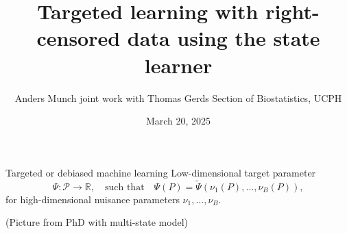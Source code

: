 \documentclass[smaller]{beamer}\usepackage{listings}
\author{Anders Munch \newline \small joint work with Thomas Gerds \newline \newline Section of Biostatistics, UCPH}
\date{March 20, 2025}
\title{Targeted learning with right-censored data using the state learner}
\newcommand{\R}{\mathbb{R}}
\newcommand{\1}{\mathds{1}}
\begin{document}
\maketitle

\begin{frame}[label={sec:org3c06c93}]{Targeted or debiased machine learning}
Low-dimensional target parameter
\begin{equation*}
  \Psi \colon \mathcal{P}
  \rightarrow \R,
  \quad \text{such that} \quad
  \Psi(P) =
  \tilde{\Psi}(\nu_1(P), \dots , \nu_B(P)),
\end{equation*}
for high-dimensional nuisance parameters \(\nu_1, \dots,
\nu_B\).

\vfill

(Picture from PhD with multi-state model)
\end{frame}
\end{document}
